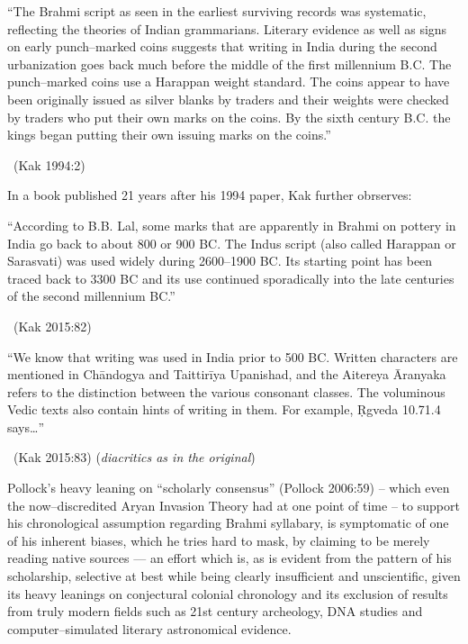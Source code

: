 \begin{myquote}
“The Brahmi script as seen in the earliest surviving records was systematic, reflecting the theories of Indian grammarians. Literary evidence as well as signs on early punch–marked coins suggests that writing in India during the second urbanization goes back much before the middle of the first millennium B.C. The punch–marked coins use a Harappan weight standard. The coins appear to have been originally issued as silver blanks by traders and their weights were checked by traders who put their own marks on the coins. By the sixth century B.C. the kings began putting their own issuing marks on the coins.” 

~\hfill (Kak 1994:2)
\end{myquote}

In a book published 21 years after his 1994 paper, Kak further obrserves:

\begin{myquote}
“According to B.B. Lal, some marks that are apparently in Brahmi on pottery in India go back to about 800 or 900 BC. The Indus script (also called Harappan or Sarasvati) was used widely during 2600–1900 BC. Its starting point has been traced back to 3300 BC and its use continued sporadically into the late centuries of the second millennium BC.” 

~\hfill (Kak 2015:82)
\end{myquote}

\begin{myquote}
“We know that writing was used in India prior to 500 BC. Written characters are mentioned in Chāndogya and Taittirīya Upanishad, and the Aitereya Āranyaka refers to the distinction between the various consonant classes. The voluminous Vedic texts also contain hints of writing in them. For example, Ṛgveda 10.71.4 says…” 

~\hfill (Kak 2015:83) (\textit{diacritics as in the original})
\end{myquote}

Pollock’s heavy leaning on “scholarly consensus” (Pollock 2006:59) – which even the now–discredited Aryan Invasion Theory had at one point of time – to support his chronological assumption regarding Brahmi syllabary, is symptomatic of one of his inherent biases, which he tries hard to mask, by claiming to be merely reading native sources — an effort which is, as is evident from the pattern of his scholarship, selective at best while being clearly insufficient and unscientific, given its heavy leanings on conjectural colonial chronology and its exclusion of results from truly modern fields such as 21st century archeology, DNA studies and computer–simulated literary astronomical evidence.


